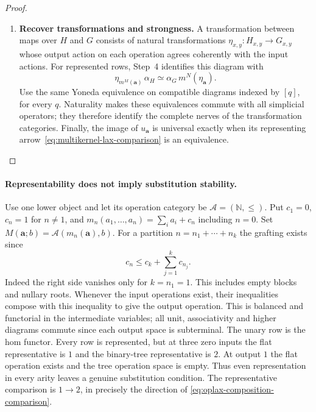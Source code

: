 \documentclass[oneside]{article}
\theoremstyle{plain}
\theoremstyle{definition}
\theoremstyle{remark}
\begin{document}
\begin{proof}
\begin{enumerate}
\[
 m^N_{\mathbf x}(H\mathbf a)
 \longrightarrow Hm^M_{\mathbf x}(\mathbf a)
 \xrightarrow{H(v)}Hb.
\]
Yoneda identifies the two procedures as inverse. Applied to each
tree, it identifies compatibility with grafting with the lax
composition axioms, including units.
\item \textbf{Recover transformations and strongness.}
A transformation between maps over $H$ and $G$ consists of natural
transformations $\eta_{x,y}:H_{x,y}\to G_{x,y}$ whose output action
on each operation agrees coherently with the input actions.
For represented rows, Step~4 identifies this diagram with
\[
 \eta_{m^M(\mathbf a)}\,\alpha_H
 \simeq
 \alpha_G\,m^N(\eta_{\mathbf a}).
\]
Use the same Yoneda equivalence on compatible diagrams indexed
by $[q]$, for every $q$. Naturality makes these equivalences
commute with all simplicial operators; they therefore identify the
complete nerves of the transformation categories. Finally, the
image of $u_{\mathbf a}$ is universal exactly when its representing
arrow~\eqref{eq:multikernel-lax-comparison} is an equivalence.\qedhere
\end{enumerate}
\end{proof}

\paragraph{Representability does not imply substitution stability.}
Use one lower object and let its operation category be
$\mathcal A=(\mathbb N,\leq)$. Put $c_1=0$, $c_n=1$ for $n\ne1$,
and $m_n(a_1,\ldots,a_n)=\sum_i a_i+c_n$ including $n=0$.
Set $M(\mathbf a;b)=\mathcal A(m_n(\mathbf a),b)$. For a partition
$n=n_1+\cdots+n_k$ the grafting exists since
\[
 c_n\leq c_k+\sum_{j=1}^k c_{n_j}.
\]
Indeed the right side vanishes only for $k=n_1=1$. This includes
empty blocks and nullary roots. Whenever the input operations exist,
their inequalities compose with this inequality to give the output
operation. This is balanced and functorial in the intermediate
variables; all unit, associativity and higher diagrams commute since
each output space is subterminal. The unary row is the hom functor.
Every row is represented, but at three zero inputs the flat
representative is $1$ and the binary-tree representative is $2$.
At output $1$ the flat operation exists and the tree operation space
is empty. Thus even representation in every arity leaves a genuine
substitution condition. The representative comparison is $1\to2$,
in precisely the direction of \eqref{eq:oplax-composition-comparison}.
\end{document}
